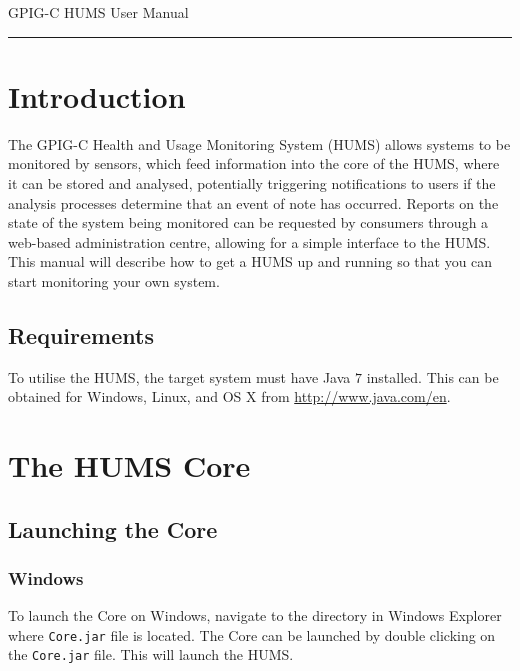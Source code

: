 \documentclass[10pt,a4paper]{article}
\begin{document}
\begin{center}
{\vspace*{-0.7cm}
\Huge GPIG-C HUMS User Manual}
\vspace*{0.3cm}

\end{center}
\vspace*{0.4cm}
\hrule
\vspace*{0.4cm}

\tableofcontents

\section{Introduction}

The GPIG-C Health and Usage Monitoring System (HUMS) allows systems to be monitored by sensors, which feed information into the core of the HUMS, where it can be stored and analysed, potentially triggering notifications to users if the analysis processes determine that an event of note has occurred. Reports on the state of the system being monitored can be requested by consumers through a web-based administration centre, allowing for a simple interface to the HUMS. This manual will describe how to get a HUMS up and running so that you can start monitoring your own system.

\subsection{Requirements}

To utilise the HUMS, the target system must have Java $7$ installed. This can be obtained for Windows, Linux, and OS X from \url{http://www.java.com/en}.

\section{The HUMS Core}
\label{sec:launching}

\subsection{Launching the Core}
\subsubsection{Windows}
To launch the Core on Windows, navigate to the directory in Windows Explorer where \texttt{Core.jar} file is located. The Core can be launched by double clicking on the \texttt{Core.jar} file. This will launch the HUMS.
\end{document}
